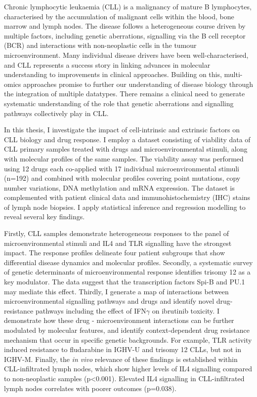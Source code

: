 \documentclass[11pt, a4paper, twosided]{book}
\begin{document}
    Chronic lymphocytic leukaemia (CLL) is a malignancy of mature B lymphocytes, characterised by the accumulation of malignant cells within the blood, bone marrow and lymph nodes. The disease follows a heterogeneous course driven by multiple factors, including genetic aberrations, signalling via the B cell receptor (BCR) and interactions with non-neoplastic cells in the tumour microenvironment. Many individual disease drivers have been well-characterised, and CLL represents a success story in linking advances in molecular understanding to improvements in clinical approaches. Building on this, multi-omics approaches promise to further our understanding of disease biology through the integration of multiple datatypes. There remains a clinical need to generate systematic understanding of the role that genetic aberrations and signalling pathways collectively play in CLL.

    In this thesis, I investigate the impact of cell-intrinsic and extrinsic factors on CLL biology and drug response. I employ a dataset consisting of viability data of CLL primary samples treated with drugs and microenvironmental stimuli, along with molecular profiles of the same samples. The viability assay was performed using 12 drugs each co-applied with 17 individual microenvironmental stimuli (n=192) and combined with molecular profiles covering point mutations, copy number variations, DNA methylation and mRNA expression. The dataset is complemented with patient clinical data and immunohistochemistry (IHC) stains of lymph node biopsies. I apply statistical inference and regression modelling to reveal several key findings.

    Firstly, CLL samples demonstrate heterogeneous responses to the panel of microenvironmental stimuli and IL4 and TLR signalling have the strongest impact. The response profiles delineate four patient subgroups that show differential disease dynamics and molecular profiles. Secondly, a systematic survey of genetic determinants of microenvironmental response identifies trisomy 12 as a key modulator. The data suggest that the transcription factors Spi-B and PU.1 may mediate this effect. Thirdly, I generate a map of interactions between microenvironmental signalling pathways and drugs and identify novel drug-resistance pathways including the effect of IFN\(\gamma\) on ibrutinib toxicity. I demonstrate how these drug - microenvironment interactions can be further modulated by molecular features, and identify context-dependent drug resistance mechanism that occur in specific genetic backgrounds. For example, TLR activity induced resistance to fludarabine in IGHV-U and trisomy 12 CLLs, but not in IGHV-M. Finally, the \emph{in vivo} relevance of these findings is established within CLL-infiltrated lymph nodes, which show higher levels of IL4 signalling compared to non-neoplastic samples (p\textless0.001). Elevated IL4 signalling in CLL-infiltrated lymph nodes correlates with poorer outcomes (p=0.038).
\end{document}
